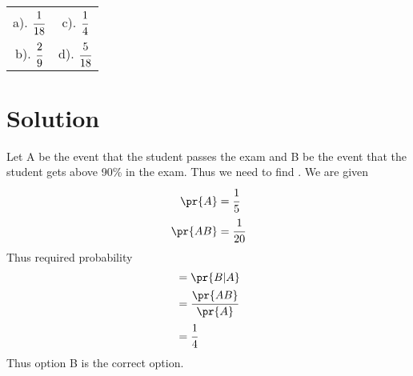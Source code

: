 \begin{table}[h]
\setlength{\tabcolsep}{40pt}
    \begin{tabular}{c c}
         a). $\cfrac{1}{18}$ & c). $\cfrac{1}{4}$ \\
         b). $\cfrac{2}{9}$  & d). $\cfrac{5}{18}$
    \end{tabular}
\end{table}
\section{Solution}
Let A be the event that the student passes the exam and B be the event that the student gets above 90\% in the exam. Thus we need to find . We are given
\begin{align}
    \pr{A}  &= \cfrac{1}{5}\\
    \pr{AB} &= \cfrac{1}{20}
\end{align}
Thus required probability 
\begin{align}
    &= \pr{B|A}\\
    &= \cfrac{\pr{AB}}{\pr{A}}\\
    &= \cfrac{1}{4}    
\end{align}
Thus option B is the correct option.